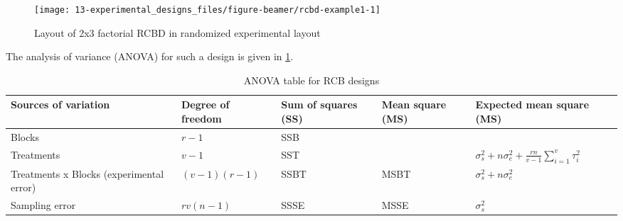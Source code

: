 \documentclass[
  ignorenonframetext,
  aspectratio=169]{beamer}
\begin{document}
\begin{frame}{}
\protect\hypertarget{section-6}{}
\begin{figure}
\texttt{[image: 13-experimental\_designs\_files/figure-beamer/rcbd-example1-1]} \caption{Layout of 2x3 factorial RCBD in randomized experimental layout}\label{fig:rcbd-example1}
\end{figure}
\end{frame}

\begin{frame}{}
\protect\hypertarget{section-7}{}
The analysis of variance (ANOVA) for such a design is given in
\ref{tab:anova-rcbd-template}.

\begin{table}

\caption{\label{tab:anova-rcbd-template}ANOVA table for RCB designs}
\centering
\fontsize{8}{10}\selectfont
\begin{tabular}[t]{>{\raggedright\arraybackslash}p{6em}>{\raggedright\arraybackslash}p{5em}>{\raggedright\arraybackslash}p{5em}>{\raggedright\arraybackslash}p{5em}>{\raggedright\arraybackslash}p{8em}}
\toprule
Sources of variation & Degree of freedom & Sum of squares (SS) & Mean square (MS) & Expected mean square (MS)\\
\midrule
Blocks & $r - 1$ & SSB &  & \\
Treatments & $v-1$ & SST &  & $\sigma_s^2 + n \sigma_e^2 + \frac{rn}{v-1} \sum_{i = 1}^v \tau_i^2$\\
Treatments x Blocks (experimental error) & $(v-1)(r-1)$ & SSBT & MSBT & $\sigma_s^2 + n \sigma_e^2$\\
Sampling error & $rv(n-1)$ & SSSE & MSSE & $\sigma_s^2$\\
\bottomrule
\end{tabular}
\end{table}
\end{frame}
\end{document}
